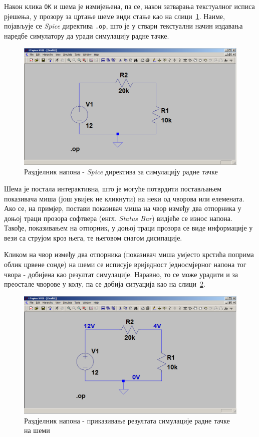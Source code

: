 Након клика \texttt{OK} и шема је измијењена, па се, након затварања текстуалног исписа рјешења, у прозору за цртање шеме види стање као на слици~\ref{Fig:rn-op2}. Наиме, појављује се \textit{Spice} директива \texttt{.op}, што је у ствари текстуални начин издавања наредбе симулатору да уради симулацију радне тачке.

\begin{figure}[h]
\centering
\includegraphics[width=\figwidth\textwidth]{figs/rn-op2.PNG}
\caption{Раздјелник напона - \textit{Spice} директива за симулацију радне тачке}
\label{Fig:rn-op2}
\end{figure}

Шема је постала интерактивна, што је могуће потврдити постављањем показивача миша (још увијек не кликнути) на неки од чворова или елемената. Ако се, на примјер, постави показивач миша на чвор између два отпорника у доњој траци прозора софтвера (енгл. \textit{Status Bar}) видјеће се износ напона. Такође, показивањем на отпорник, у доњој траци прозора се виде информације у вези са струјом кроз њега, те његовом снагом дисипације.

Кликом на чвор између два отпорника (показивач миша умјесто крстића поприма облик црвене сонде) на шеми се исписује вриједност једносмјерног напона тог чвора - добијена као резултат симулације. Наравно, то се може урадити и за преостале чворове у колу, па се добија ситуација као на слици~\ref{Fig:rn-op3}.

\begin{figure}[h]
\centering
\includegraphics[width=\figwidth\textwidth]{figs/rn-op3.PNG}
\caption{Раздјелник напона - приказивање резултата симулације радне тачке на шеми}
\label{Fig:rn-op3}
\end{figure}

